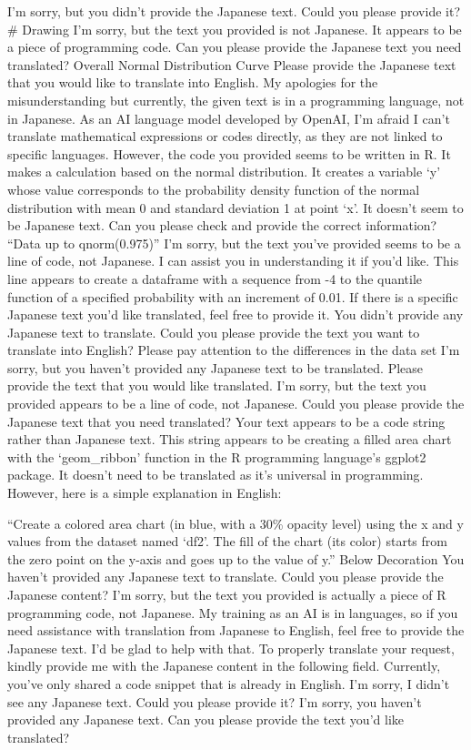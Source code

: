 \documentclass[
  a4paper,
]{book}
\begin{document}
I'm sorry, but you didn't provide the Japanese text. Could you please
provide it? \# Drawing I'm sorry, but the text you provided is not
Japanese. It appears to be a piece of programming code. Can you please
provide the Japanese text you need translated? Overall Normal
Distribution Curve Please provide the Japanese text that you would like
to translate into English. My apologies for the misunderstanding but
currently, the given text is in a programming language, not in Japanese.
As an AI language model developed by OpenAI, I'm afraid I can't
translate mathematical expressions or codes directly, as they are not
linked to specific languages. However, the code you provided seems to be
written in R. It makes a calculation based on the normal distribution.
It creates a variable `y' whose value corresponds to the probability
density function of the normal distribution with mean 0 and standard
deviation 1 at point `x'. It doesn't seem to be Japanese text. Can you
please check and provide the correct information? ``Data up to
qnorm(0.975)'' I'm sorry, but the text you've provided seems to be a
line of code, not Japanese. I can assist you in understanding it if
you'd like. This line appears to create a dataframe with a sequence from
-4 to the quantile function of a specified probability with an increment
of 0.01. If there is a specific Japanese text you'd like translated,
feel free to provide it. You didn't provide any Japanese text to
translate. Could you please provide the text you want to translate into
English? Please pay attention to the differences in the data set I'm
sorry, but you haven't provided any Japanese text to be translated.
Please provide the text that you would like translated. I'm sorry, but
the text you provided appears to be a line of code, not Japanese. Could
you please provide the Japanese text that you need translated? Your text
appears to be a code string rather than Japanese text. This string
appears to be creating a filled area chart with the `geom\_ribbon'
function in the R programming language's ggplot2 package. It doesn't
need to be translated as it's universal in programming. However, here is
a simple explanation in English:

``Create a colored area chart (in blue, with a 30\% opacity level) using
the x and y values from the dataset named `df2'. The fill of the chart
(its color) starts from the zero point on the y-axis and goes up to the
value of y.'' Below Decoration You haven't provided any Japanese text to
translate. Could you please provide the Japanese content? I'm sorry, but
the text you provided is actually a piece of R programming code, not
Japanese. My training as an AI is in languages, so if you need
assistance with translation from Japanese to English, feel free to
provide the Japanese text. I'd be glad to help with that. To properly
translate your request, kindly provide me with the Japanese content in
the following field. Currently, you've only shared a code snippet that
is already in English. I'm sorry, I didn't see any Japanese text. Could
you please provide it? I'm sorry, you haven't provided any Japanese
text. Can you please provide the text you'd like translated?
\end{document}
